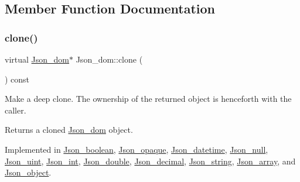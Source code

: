 \subsection{Member Function Documentation}
\mbox{\label{classJson__dom_a03c529d590cc4cdb747ccb82f4b70fb5}} 
\subsubsection{\texorpdfstring{clone()}{clone()}}
{\footnotesize\ttfamily virtual \mbox{\hyperlink{classJson__dom}{Json\+\_\+dom}}$\ast$ Json\+\_\+dom\+::clone (\begin{DoxyParamCaption}{ }\end{DoxyParamCaption}) const\hspace{0.3cm}{\ttfamily [pure virtual]}}

Make a deep clone. The ownership of the returned object is henceforth with the caller.

\begin{DoxyReturn}{Returns}
a cloned \mbox{\hyperlink{classJson__dom}{Json\+\_\+dom}} object. 
\end{DoxyReturn}


Implemented in \mbox{\hyperlink{classJson__boolean_a4af266d49e532a2155e68a5b9fbcbff9}{Json\+\_\+boolean}}, \mbox{\hyperlink{classJson__opaque_ab40f723d80c2cfcaa4077fb4187c0fc8}{Json\+\_\+opaque}}, \mbox{\hyperlink{classJson__datetime_a2c4c37beb0c84fa7cdaeb1c2f28b07c4}{Json\+\_\+datetime}}, \mbox{\hyperlink{classJson__null_a4d3a0b51950099648e5f7a773b386d49}{Json\+\_\+null}}, \mbox{\hyperlink{classJson__uint_acdc931eba3b28293ca6e16d698732d42}{Json\+\_\+uint}}, \mbox{\hyperlink{classJson__int_abfcff916299a0bd41dd18ed1596d0444}{Json\+\_\+int}}, \mbox{\hyperlink{classJson__double_a2df30c0e413cebf858b13b8ce2f9f91c}{Json\+\_\+double}}, \mbox{\hyperlink{classJson__decimal_a73afc8bc022cc9d7a31e4404613933ff}{Json\+\_\+decimal}}, \mbox{\hyperlink{classJson__string_a57fb9e6a51883be719c67d3c6ceb6af9}{Json\+\_\+string}}, \mbox{\hyperlink{classJson__array_a936f17ef11712af8bfd2d6d1aa5c9ba1}{Json\+\_\+array}}, and \mbox{\hyperlink{classJson__object_a2a723c5eb14d6532aa85097b9719f2c7}{Json\+\_\+object}}.

\mbox{\label{classJson__dom_a779b8c6ac78329409f8be12e6d082782}} 
